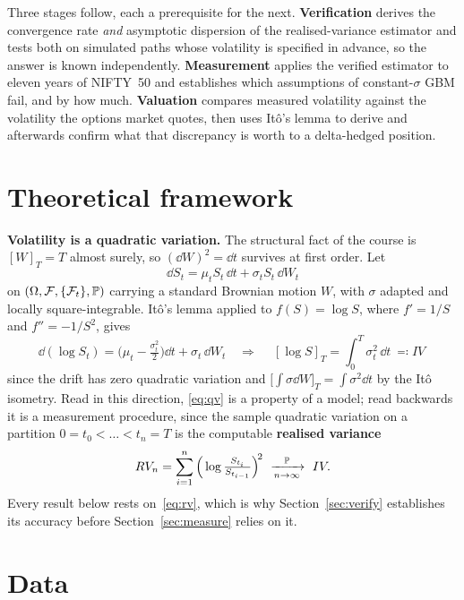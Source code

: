 \documentclass[10pt,a4paper]{article}
\begin{document}
Three stages follow, each a prerequisite for the next. \textbf{Verification} derives the
convergence rate \emph{and} asymptotic dispersion of the realised-variance estimator and tests
both on simulated paths whose volatility is specified in advance, so the answer is known
independently. \textbf{Measurement} applies the verified estimator to eleven years of NIFTY~50
and establishes which assumptions of constant-$\sigma$ GBM fail, and by how much.
\textbf{Valuation} compares measured volatility against the volatility the options market
quotes, then uses It\^o's lemma to derive and afterwards confirm what that discrepancy is
worth to a delta-hedged position.

\section{Theoretical framework}

\textbf{Volatility is a quadratic variation.} The structural fact of the course is $[W]_T=T$
almost surely, so $(\dd W)^2=\dd t$ survives at first order. Let
\begin{equation}
  \dd S_t=\mu_t S_t\,\dd t+\sigma_t S_t\,\dd W_t
  \label{eq:sde}
\end{equation}
on $(\Omega,\mathcal{F},\{\mathcal{F}_t\},\mathbb{P})$ carrying a standard Brownian motion $W$, with $\sigma$ adapted
and locally square-integrable. It\^o's lemma applied to $f(S)=\log S$, where $f'=1/S$ and
$f''=-1/S^2$, gives
\begin{equation}
  \dd(\log S_t)=\Big(\mu_t-\tfrac{\sigma_t^2}{2}\Big)\dd t+\sigma_t\,\dd W_t
  \quad\Longrightarrow\quad
  \boxed{\ [\log S]_T=\int_0^T\sigma_t^2\,\dd t\ \eqqcolon IV\ }
  \label{eq:qv}
\end{equation}
since the drift has zero quadratic variation and $\big[\int\sigma\dd W\big]_T=\int\sigma^2\dd t$
by the It\^o isometry. Read in this direction, \eqref{eq:qv} is a property of a model; read
backwards it is a measurement procedure, since the sample quadratic variation on a partition
$0=t_0<\dots<t_n=T$ is the computable \textbf{realised variance}
\begin{equation}
  RV_n=\sum_{i=1}^{n}\Big(\log\tfrac{S_{t_i}}{S_{t_{i-1}}}\Big)^{\!2}
  \ \xrightarrow[n\to\infty]{\mathbb{P}}\ IV .
  \label{eq:rv}
\end{equation}
Every result below rests on~\eqref{eq:rv}, which is why Section~\ref{sec:verify} establishes
its accuracy before Section~\ref{sec:measure} relies on it.

\section{Data}
\end{document}
